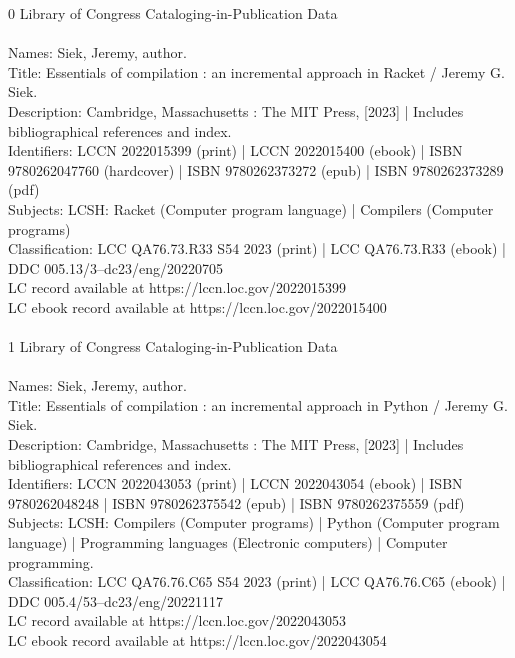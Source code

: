 \documentclass[7x10]{TimesAPriori_MIT}%
\def\racketEd{0}
\def\pythonEd{1}
\def\edition{1}
\numberwithin{theorem}{chapter}
\numberwithin{definition}{chapter}
\numberwithin{equation}{chapter}
\begin{document}
\begin{copyrightpage}
{\if\edition\racketEd
Library of Congress Cataloging-in-Publication Data\\
\ \\
Names: Siek, Jeremy, author.  \\
Title: Essentials of compilation : an incremental approach in Racket / Jeremy G. Siek.  \\
Description: Cambridge, Massachusetts : The MIT Press, [2023] | Includes bibliographical references and index. \\
Identifiers: LCCN 2022015399 (print) | LCCN 2022015400 (ebook) | ISBN 9780262047760 (hardcover) | ISBN 9780262373272 (epub) | ISBN 9780262373289 (pdf)  \\
Subjects: LCSH: Racket (Computer program language) | Compilers (Computer programs) \\
Classification: LCC QA76.73.R33 S54 2023  (print) | LCC QA76.73.R33 (ebook) | DDC 005.13/3--dc23/eng/20220705 \\
LC record available at https://lccn.loc.gov/2022015399\\
LC ebook record available at https://lccn.loc.gov/2022015400\\
\ \\
\fi}
%
{\if\edition\pythonEd
Library of Congress Cataloging-in-Publication Data\\
\ \\
Names: Siek, Jeremy, author.  \\
Title: Essentials of compilation : an incremental approach in Python / Jeremy G. Siek.  \\
Description: Cambridge, Massachusetts : The MIT Press, [2023] | Includes 
   bibliographical references and index. \\
Identifiers: LCCN 2022043053 (print) | LCCN 2022043054 (ebook) | ISBN 
   9780262048248 | ISBN 9780262375542 (epub) | ISBN 9780262375559 (pdf)  \\
Subjects: LCSH: Compilers (Computer programs) | Python (Computer program 
   language) | Programming languages (Electronic computers) | Computer 
   programming. \\
Classification: LCC QA76.76.C65 S54 2023  (print) | LCC QA76.76.C65  
   (ebook) | DDC 005.4/53--dc23/eng/20221117 \\
LC record available at https://lccn.loc.gov/2022043053\\
LC ebook record available at https://lccn.loc.gov/2022043054  \\
\ \\
\fi}


\end{copyrightpage}
\end{document}
